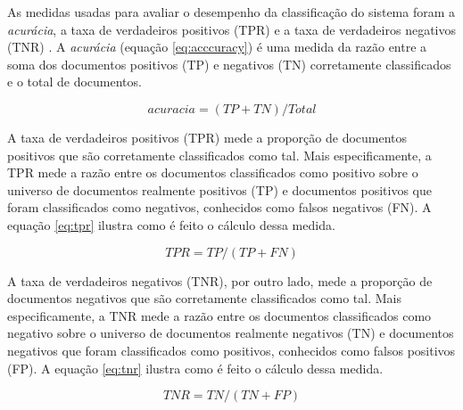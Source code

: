 \documentclass[template.tex]{subfiles}
\begin{document}

As medidas usadas para avaliar o desempenho da classificação do sistema foram a \textit{acurácia}, a taxa de verdadeiros positivos (TPR) e a taxa de verdadeiros negativos (TNR) \cite{garcia2012multi}. A \textit{acurácia} (equação \ref{eq:acccuracy}) é uma medida da razão entre a soma dos documentos positivos (TP) e negativos (TN) corretamente classificados e o total de documentos.

\begin{equation}
acuracia =  (TP + TN) / Total
\label{eq:acccuracy}
\end{equation}

A taxa de verdadeiros positivos (TPR) mede a proporção de documentos positivos que são corretamente classificados como tal. Mais especificamente, a TPR mede a razão entre os documentos classificados como positivo sobre o universo de documentos realmente positivos (TP) e documentos positivos que foram classificados como negativos, conhecidos como falsos negativos (FN). A equação \ref{eq:tpr} ilustra como é feito o cálculo dessa medida. 

\begin{equation}
TPR = TP / (TP + FN)
\label{eq:tpr}
\end{equation}

A taxa de verdadeiros negativos (TNR), por outro lado, mede a proporção de documentos negativos que são corretamente classificados como tal. Mais especificamente, a TNR mede a razão entre os documentos classificados como negativo sobre o universo de documentos realmente negativos (TN) e documentos negativos que foram classificados como positivos, conhecidos como falsos positivos (FP). A equação \ref{eq:tnr} ilustra como é feito o cálculo dessa medida. 

\begin{equation}
TNR = TN / (TN + FP)
\label{eq:tnr}
\end{equation}


\end{document}
